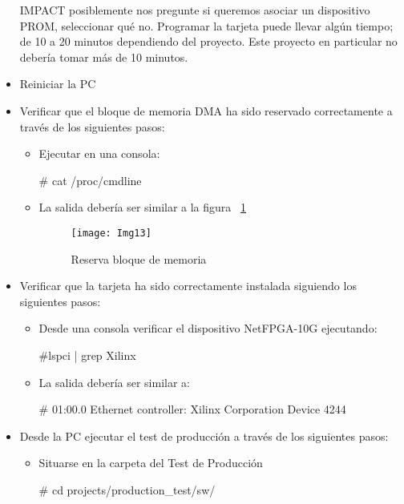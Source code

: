 \begin{itemize}
IMPACT posiblemente nos pregunte si queremos asociar un dispositivo PROM, seleccionar qué no. Programar la tarjeta puede llevar algún tiempo; de 10 a 20 minutos dependiendo del proyecto. Este proyecto en particular no debería tomar más de 10 minutos.

\item Reiniciar la PC

\item Verificar que el bloque de memoria DMA ha sido reservado correctamente a través de los siguientes pasos:

\begin{itemize}
\item Ejecutar en una consola:
\begin{bash}    
# cat /proc/cmdline
\end{bash}    
  
\item La salida debería ser similar a la figura ~\ref{fig:Img13}

\begin{figure}[htbp!] 
\centering    
\texttt{[image: Img13]}
\caption[Reserva bloque de memoria]{Reserva bloque de memoria}
\label{fig:Img13}
\end{figure}

\end{itemize}

\item Verificar que la tarjeta ha sido correctamente instalada siguiendo los siguientes pasos:

\begin{itemize}
\item Desde una consola verificar el dispositivo NetFPGA-10G ejecutando:
\begin{bash}
#lspci | grep Xilinx
\end{bash}

\item La salida debería ser similar a:
\begin{bash}
# 01:00.0 Ethernet controller: Xilinx Corporation Device 4244
\end{bash}

\end{itemize}

\item Desde la PC ejecutar el test de producción a través de los siguientes pasos:

\begin{itemize}
\item Situarse en la carpeta del Test de Producción
\begin{bash}
# cd projects/production_test/sw/
\end{bash}


\end{itemize}
\end{itemize}
